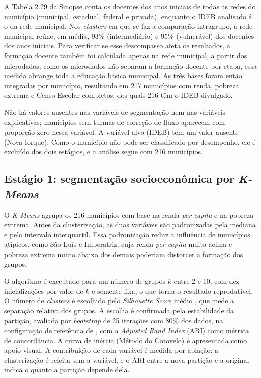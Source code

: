 A Tabela 2.29 da Sinopse conta os docentes dos anos iniciais de todas as redes do município (municipal, estadual, federal e privada), enquanto o IDEB analisado é o da rede municipal. Nos \textit{clusters} em que se faz a comparação intragrupo, a rede municipal reúne, em média, 93\% (intermediário) e 95\% (vulnerável) dos docentes dos anos iniciais. Para verificar se esse descompasso afeta os resultados, a formação docente também foi calculada apenas na rede municipal, a partir dos microdados; como os microdados não separam a formação docente por etapa, essa medida abrange toda a educação básica municipal. As três bases foram então integradas por município, resultando em 217 municípios com renda, pobreza extrema e Censo Escolar completos, dos quais 216 têm o IDEB divulgado.

Não há valores ausentes nas variáveis de segmentação nem nas variáveis explicativas; municípios sem turmas de correção de fluxo aparecem com proporção zero nessa variável. A variável-alvo (IDEB) tem um valor ausente (Nova Iorque). Como o município não pode ser classificado por desempenho, ele é excluído dos dois estágios, e a análise segue com 216 municípios.

\subsection{Estágio 1: segmentação socioeconômica por \textit{K-Means}}

O \textit{K-Means} \citep{macqueen1967} agrupa os 216 municípios com base na renda \textit{per capita} e na pobreza extrema. Antes da clusterização, as duas variáveis são padronizadas pela mediana e pelo intervalo interquartil. Essa padronização reduz a influência de municípios atípicos, como São Luís e Imperatriz, cuja renda \textit{per capita} muito acima e pobreza extrema muito abaixo dos demais poderiam distorcer a formação dos grupos.

O algoritmo é executado para um número de grupos $k$ entre 2 e 10, com dez inicializações por valor de $k$ e semente fixa, o que torna o resultado reprodutível. O número de \textit{clusters} é escolhido pelo \textit{Silhouette Score} médio \citep{rousseeuw1987}, que mede a separação relativa dos grupos. A escolha é confirmada pela estabilidade da partição, avaliada por \textit{bootstrap} de 25 iterações com 80\% dos dados, na configuração de referência de \citet{benhur2002}, com o \textit{Adjusted Rand Index} (ARI) como métrica de concordância. A curva de inércia (Método do Cotovelo) é apresentada como apoio visual. A contribuição de cada variável é medida por ablação: a clusterização é refeita sem a variável, e o ARI entre a nova partição e a original indica o quanto a partição depende dela.

